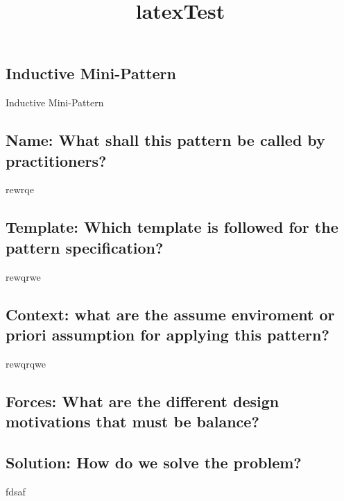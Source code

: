 
\title{latexTest}
\maketitle
\subsection{Inductive Mini-Pattern}
Inductive Mini-Pattern
\subsection{Name: What shall this pattern be called by practitioners?}
rewrqe
\subsection{Template: Which template is followed for the pattern specification?}
rewqrwe
\subsection{Context: what are the assume enviroment or priori assumption for applying this pattern?}
rewqrqwe
\subsection{Forces: What are the different design motivations that must be balance?}

\subsection{Solution: How do we solve the problem?}
fdsaf

